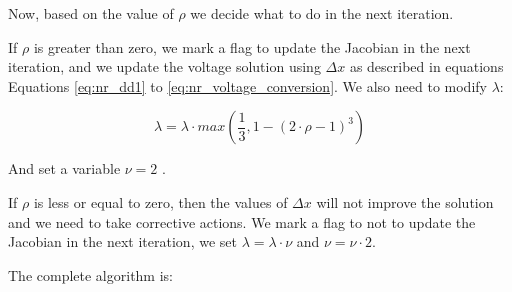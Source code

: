 \documentclass[a4paper,twoside]{tufte-book}
\begin{document}
Now, based on the value of $\rho$ we decide what to do in the next iteration.

If $\rho$ is greater than zero, we mark a flag to update the Jacobian in the next iteration, and we update the voltage solution using $\Delta x$ as described in equations Equations \ref{eq:nr_dd1} to \ref{eq:nr_voltage_conversion}. We also need to modify $\lambda$:


\begin{equation}
\lambda = \lambda \cdot max(\frac{1}{3}, 1-(2\cdot \rho -1)^3)
\label{eq:lm_update_l}
\end{equation}

And set a variable $\nu=2$ .


If $\rho$ is less or equal to zero, then the values of $\Delta x$ will not improve the solution and we need to take corrective actions. We mark a flag to not to update the Jacobian in the next iteration, we set $\lambda=\lambda \cdot \nu$ and $\nu = \nu \cdot 2$.


The complete algorithm is: 
\end{document}
